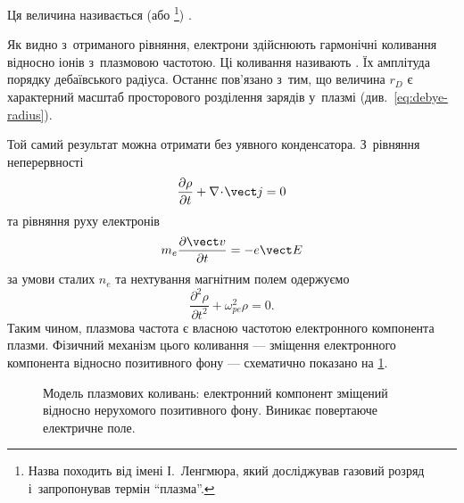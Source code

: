 Ця величина називається  (або \footnote{Назва походить від імені І.~Ленгмюра, який досліджував газовий розряд і~запропонував термін \enquote{плазма}.}) .

Як видно з~отриманого рівняння, електрони здійснюють гармонічні коливання відносно іонів з~плазмовою частотою. Ці коливання називають . Їх амплітуда порядку дебаївського радіуса. Останнє пов'язано з~тим, що величина $r_D$ є характерний масштаб просторового розділення зарядів у~плазмі (див.~\eqref{eq:debye-radius}).

Той самий результат можна отримати без уявного конденсатора. З~рівняння неперервності
\begin{equation}
	\frac{\partial\rho}{\partial t}
	+\nabla\!\cdot\!\vect j=0
\end{equation}
та рівняння руху електронів
\begin{equation}
	m_e\frac{\partial\vect v}{\partial t}=-e\vect E
\end{equation}
за умови сталих $n_e$ та нехтування магнітним полем одержуємо
\begin{equation}
	\frac{\partial^2\rho}{\partial t^2}
	+\omega_{pe}^2\rho=0.
\end{equation}
Таким чином, плазмова частота є власною частотою електронного компонента плазми. Фізичний механізм цього коливання — зміщення електронного компонента відносно позитивного фону — схематично показано на \ref{fig:plasma-oscillation}.

\begin{figure}[htbp]\centering
	\begin{subfigure}[t]{0.5\linewidth}\centering
	\end{subfigure}%
	\begin{subfigure}[t]{0.5\linewidth}\centering
	\end{subfigure}
	\caption{Модель плазмових коливань: електронний компонент зміщений відносно нерухомого позитивного фону. Виникає повертаюче електричне поле.}\label{fig:plasma-oscillation}
\end{figure}

